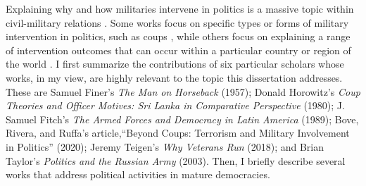 \documentclass[
  12pt,
  oneside]{memoir}
\begin{document}
Explaining why and how militaries intervene in politics is a massive topic within civil-military relations \autocites[for a sampling of this scholarship, see][]{finer_man_1962,taylor_politics_2003,croissant_beyond_2010,bove_beyond_2020,beliakova_erosion_2021}. Some works focus on specific types or forms of military intervention in politics, such as coups \autocite{horowitz_coup_1980,de_bruin_will_2019}, while others focus on explaining a range of intervention outcomes that can occur within a particular country or region of the world \autocites[for instance, see][]{stepan_new_1973,fitch_armed_1998}. I first summarize the contributions of six particular scholars whose works, in my view, are highly relevant to the topic this dissertation addresses. These are Samuel Finer's \emph{The Man on Horseback} (1957); Donald Horowitz's \emph{Coup Theories and Officer Motives: Sri Lanka in Comparative Perspective} (1980); J. Samuel Fitch's \emph{The Armed Forces and Democracy in Latin America} (1989); Bove, Rivera, and Ruffa's article,``Beyond Coups: Terrorism and Military Involvement in Politics'' (2020); Jeremy Teigen's \emph{Why Veterans Run} (2018); and Brian Taylor's \emph{Politics and the Russian Army} (2003). Then, I briefly describe several works that address political activities in mature democracies.
\end{document}
